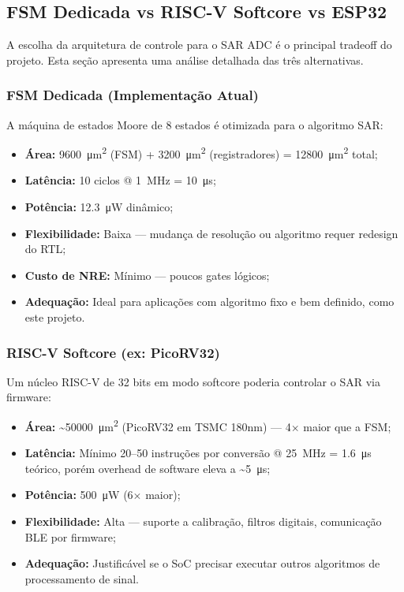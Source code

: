 \documentclass[12pt,a4paper]{article}
\begin{document}
\subsection{FSM Dedicada vs RISC-V Softcore vs ESP32}

A escolha da arquitetura de controle para o SAR ADC é o principal tradeoff
do projeto. Esta seção apresenta uma análise detalhada das três alternativas.

\subsubsection{FSM Dedicada (Implementação Atual)}

A máquina de estados Moore de 8 estados é otimizada para o algoritmo SAR:
\begin{itemize}
  \item \textbf{Área:} \SI{9600}{\micro\meter\squared} (FSM) + \SI{3200}{\micro\meter\squared}
        (registradores) = \SI{12800}{\micro\meter\squared} total;
  \item \textbf{Latência:} 10 ciclos @ \SI{1}{\mega\hertz} = \SI{10}{\micro\second};
  \item \textbf{Potência:} \SI{12.3}{\micro\watt} dinâmico;
  \item \textbf{Flexibilidade:} Baixa — mudança de resolução ou algoritmo requer
        redesign do RTL;
  \item \textbf{Custo de NRE:} Mínimo — poucos gates lógicos;
  \item \textbf{Adequação:} Ideal para aplicações com algoritmo fixo e bem
        definido, como este projeto.
\end{itemize}

\subsubsection{RISC-V Softcore (ex: PicoRV32)}

Um núcleo RISC-V de 32 bits em modo softcore poderia controlar o SAR via firmware:
\begin{itemize}
  \item \textbf{Área:} \textasciitilde{}\SI{50000}{\micro\meter\squared} (PicoRV32
        em TSMC 180nm) — 4$\times$ maior que a FSM;
  \item \textbf{Latência:} Mínimo 20--50 instruções por conversão @ \SI{25}{\mega\hertz}
        = \SI{1.6}{\micro\second} teórico, porém overhead de software eleva a
        \textasciitilde{}\SI{5}{\micro\second};
  \item \textbf{Potência:} \SI{500}{\micro\watt} (6$\times$ maior);
  \item \textbf{Flexibilidade:} Alta — suporte a calibração, filtros digitais,
        comunicação BLE por firmware;
  \item \textbf{Adequação:} Justificável se o SoC precisar executar outros
        algoritmos de processamento de sinal.
\end{itemize}
\end{document}
